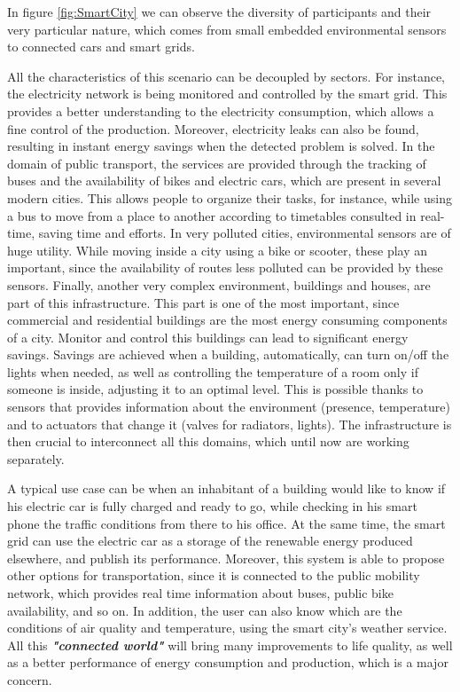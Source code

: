 In figure \ref{fig:SmartCity} we can observe the diversity of participants and their very particular nature, which comes from small embedded environmental sensors to connected cars and smart grids.

All the characteristics of this scenario can be decoupled by sectors.
For instance, the electricity network is being monitored and controlled by the smart grid\cite{farhangi2010path}.
This provides a better understanding to the electricity consumption, which allows a fine control of the production.
Moreover, electricity leaks can also be found, resulting in instant energy savings when the detected problem is solved.
In the domain of public transport, the services are provided through the tracking of buses and the availability of bikes and electric cars, which are present in several modern cities.
This allows people to organize their tasks, for instance, while using a bus to move from a place to another according to timetables consulted in real-time, saving time and efforts.
In very polluted cities, environmental sensors are of huge utility.
While moving inside a city using a bike or scooter, these play an important, since the availability of routes less polluted can be provided by these sensors.
Finally, another very complex environment, buildings and houses, are part of this infrastructure.
This part is one of the most important, since commercial and residential buildings are the most energy consuming components of a city\cite{perez2008review}.
Monitor and control this buildings can lead to significant energy savings.
Savings are achieved when a building, automatically, can turn on/off the lights when needed, as well as controlling the temperature of a room only if someone is inside, adjusting it to an optimal level.
This is possible thanks to sensors that provides information about the environment (presence, temperature) and to actuators that change it (valves for radiators, lights).
The infrastructure is then crucial to interconnect all this domains, which until now are working separately. 


A typical use case can be when an inhabitant of a building would like to know if his electric car is fully charged and ready to go, while checking in his smart phone the traffic conditions from there to his office.
At the same time, the smart grid can use the electric car as a storage of the renewable energy produced elsewhere, and publish its performance.
Moreover, this system is able to propose other options for transportation, since it is connected to the public mobility network, which provides real time information about buses, public bike availability, and so on.
In addition, the user can also know which are the conditions of air quality and temperature, using the smart city's weather service.
All this \textit{\textbf{"connected world"}} will bring many improvements to life quality, as well as a better performance of energy consumption and production, which is a major concern.

